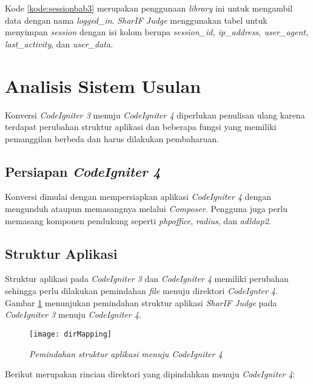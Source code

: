 Kode \ref{kode:sessionbab3} merupakan penggunaan \textit{library} ini untuk mengambil data dengan nama \textit{logged\_in}. \textit{SharIF Judge} menggunakan tabel untuk menyimpan \textit{session} dengan isi kolom berupa \textit{session\_id, ip\_address, user\_agent, last\_activity}, dan \textit{user\_data}.

\section{Analisis Sistem Usulan}
Konversi \textit{CodeIgniter 3} menuju \textit{CodeIgniter 4} diperlukan penulisan ulang karena terdapat perubahan struktur aplikasi dan beberapa fungsi yang memiliki pemanggilan berbeda dan harus dilakukan pembaharuan.
\subsection{Persiapan \textit{CodeIgniter 4}} Konversi dimulai dengan mempersiapkan aplikasi \textit{CodeIgniter 4} dengan mengunduh ataupun memasangnya melalui \textit{Composer}. Pengguna juga perlu memasang komponen pendukung seperti \textit{phpoffice}, \textit{radius}, dan \textit{adldap2}.

\subsection{Struktur Aplikasi}
Struktur aplikasi pada \textit{CodeIgniter 3} dan \textit{CodeIgniter 4} memiliki perubahan sehingga perlu dilakukan pemindahan \textit{file} menuju direktori \textit{CodeIgnter 4}. Gambar \ref{fig:dirMapping} menunjukan pemindahan struktur aplikasi \textit{SharIF Judge} pada \textit{CodeIgniter 3} menuju \textit{CodeIgniter 4}.
\begin{figure}[H]
	\centering  
	\texttt{[image: dirMapping]}  
	\caption[Pemindahan struktur aplikasi menuju \textit{CodeIgniter 4}]{\textit{Pemindahan struktur aplikasi menuju \textit{CodeIgniter 4}}} 
	\label{fig:dirMapping} 
\end{figure} 

Berikut merupakan rincian direktori yang dipindahkan menuju \textit{CodeIgniter 4}:
